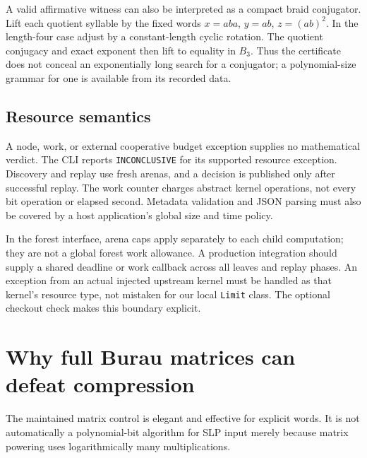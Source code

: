 \documentclass[11pt,letterpaper]{article}
\theoremstyle{definition}\newtheorem{definition}[theorem]{Definition}
\theoremstyle{remark}\newtheorem{remark}[theorem]{Remark}
\begin{document}
A valid affirmative witness can also be interpreted as a compact braid conjugator. Lift each quotient syllable by the fixed words $x=aba$, $y=ab$, $z=(ab)^2$. In the length-four case adjust by a constant-length cyclic rotation. The quotient conjugacy and exact exponent then lift to equality in $B_3$. Thus the certificate does not conceal an exponentially long search for a conjugator; a polynomial-size grammar for one is available from its recorded data.

\subsection{Resource semantics}
A node, work, or external cooperative budget exception supplies no mathematical verdict. The CLI reports \texttt{INCONCLUSIVE} for its supported resource exception. Discovery and replay use fresh arenas, and a decision is published only after successful replay. The work counter charges abstract kernel operations, not every bit operation or elapsed second. Metadata validation and JSON parsing must also be covered by a host application's global size and time policy.

In the forest interface, arena caps apply separately to each child computation; they are not a global forest work allowance. A production integration should supply a shared deadline or work callback across all leaves and replay phases. An exception from an actual injected upstream kernel must be handled as that kernel's resource type, not mistaken for our local \texttt{Limit} class. The optional checkout check makes this boundary explicit.

\section{Why full Burau matrices can defeat compression}
The maintained matrix control is elegant and effective for explicit words. It is not automatically a polynomial-bit algorithm for SLP input merely because matrix powering uses logarithmically many multiplications.
\end{document}
